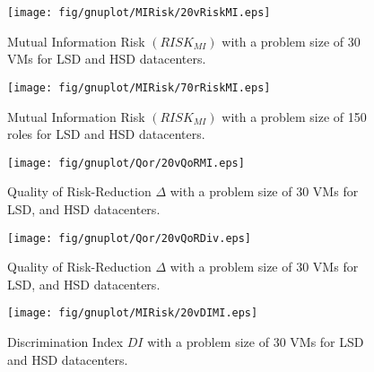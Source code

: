 \begin{figure}[t!]
    \begin{center}
        \texttt{[image: fig/gnuplot/MIRisk/20vRiskMI.eps]}

        \caption{Mutual Information Risk $(RISK_{MI})$ with a problem size of 30 VMs  for LSD and HSD datacenters.} 
        \label{fig:20vRiskMI}
        \vspace{-1.0em}
     \end{center}         
\end{figure} 

\begin{figure}[t!]
    \begin{center}
        \texttt{[image: fig/gnuplot/MIRisk/70rRiskMI.eps]}

        \caption{Mutual Information Risk $(RISK_{MI})$ with a problem size of 150 roles for LSD and HSD datacenters.} 
        \label{fig:70rRiskMI}
        \vspace{-2.0em}
     \end{center}         
\end{figure} 

\begin{figure}[t!]
    \begin{center}
        \texttt{[image: fig/gnuplot/Qor/20vQoRMI.eps]}

        \caption{Quality of Risk-Reduction  $\Delta$ with a problem size of 30 VMs  for LSD, and HSD datacenters.} 
        \label{fig:20vQoRMI}
        \vspace{-2.0em}
     \end{center}         
\end{figure} 

 \begin{figure}[t!]
    \begin{center}
        \texttt{[image: fig/gnuplot/Qor/20vQoRDiv.eps]}

        \caption{Quality of Risk-Reduction  $\Delta$ with a problem size of 30 VMs  for LSD, and HSD datacenters.} 
        \label{fig:20vQoRDiv}
        \vspace{-2.0em}
     \end{center}         
\end{figure}  

\begin{figure}[h!]
    \begin{center}
        \texttt{[image: fig/gnuplot/MIRisk/20vDIMI.eps]}

        \caption{Discrimination Index  $DI$ with a problem size of 30 VMs  for LSD and  HSD datacenters.} 
        \label{fig:20vDIMI}
        \vspace{-2.0em}
     \end{center}         
\end{figure} 

